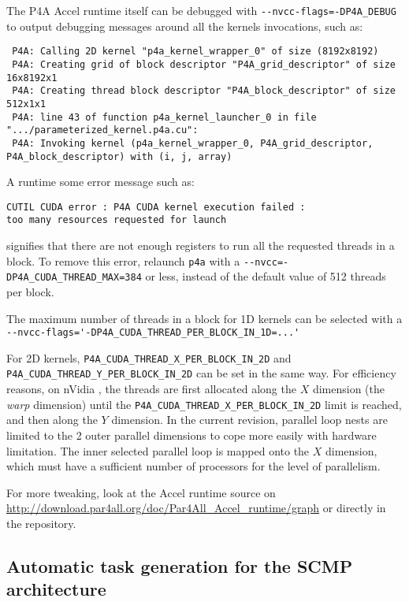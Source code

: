 \documentclass[a4paper]{article}
\begin{document}
The P4A Accel runtime itself can be debugged with
\verb|--nvcc-flags=-DP4A_DEBUG| to output debugging messages around all
the \Acuda kernels invocations, such as: {\scriptsize
\begin{verbatim}
 P4A: Calling 2D kernel "p4a_kernel_wrapper_0" of size (8192x8192)
 P4A: Creating grid of block descriptor "P4A_grid_descriptor" of size 16x8192x1
 P4A: Creating thread block descriptor "P4A_block_descriptor" of size 512x1x1
 P4A: line 43 of function p4a_kernel_launcher_0 in file ".../parameterized_kernel.p4a.cu":
 P4A: Invoking kernel (p4a_kernel_wrapper_0, P4A_grid_descriptor, P4A_block_descriptor) with (i, j, array)
\end{verbatim}
}

A runtime some error message such as:
\begin{verbatim}
CUTIL CUDA error : P4A CUDA kernel execution failed :
too many resources requested for launch
\end{verbatim}
signifies that there are not enough registers to run all the requested
threads in a block. To remove this error,
relaunch \texttt{p4a} with a
\verb|--nvcc=-DP4A_CUDA_THREAD_MAX=384| or less, instead of the default
value of 512 threads per block.

The maximum number of threads in a block for 1D
kernels can be selected with a
\verb|--nvcc-flags='-DP4A_CUDA_THREAD_PER_BLOCK_IN_1D=...'|

For 2D kernels, \verb|P4A_CUDA_THREAD_X_PER_BLOCK_IN_2D| and
\verb|P4A_CUDA_THREAD_Y_PER_BLOCK_IN_2D| can be set in the same way. For
efficiency reasons, on nVidia \Agpu, the threads are first allocated along
the $X$ dimension (the \emph{warp} dimension) until the
\verb|P4A_CUDA_THREAD_X_PER_BLOCK_IN_2D| limit is reached, and then along
the $Y$ dimension. In the current revision, parallel loop nests are
limited to the 2 outer parallel dimensions to cope more easily with \Acuda
\Agpu hardware limitation. The inner selected parallel loop is mapped onto
the $X$ \Agpu dimension, which must have a sufficient number of processors
for the level of parallelism.

For more tweaking, look at the \Apfa Accel runtime source on
\url{http://download.par4all.org/doc/Par4All_Accel_runtime/graph} or
directly in the \Agit repository.

\subsection{Automatic task generation for the SCMP architecture}
\label{sec:autom-parall-with}
\end{document}
